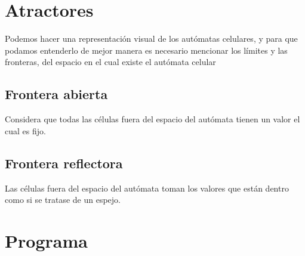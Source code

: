 \documentclass[11pt]{article}
\begin{document}
	\section{Atractores}
	Podemos hacer una representación visual de los autómatas celulares, y para que podamos entenderlo de mejor manera es necesario mencionar los límites y las fronteras, del espacio en el cual existe el autómata celular

		\subsection{Frontera abierta}
		Considera que todas las células fuera del espacio del autómata tienen un valor el cual es fijo.	
		
		\subsection{Frontera reflectora}
		Las células fuera del espacio del autómata toman los valores que están dentro como si se tratase de un espejo.

		

		
	\section{Programa}	
\end{document}
